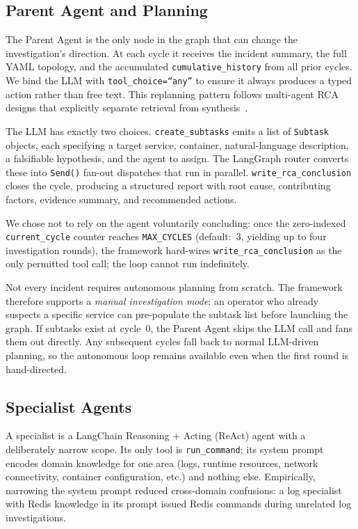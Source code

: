 \documentclass[conference]{IEEEtran}
\begin{document}
\subsection{Parent Agent and Planning}

The Parent Agent is the only node in the graph that can change the
investigation's direction. At each cycle it receives the incident
summary, the full YAML topology, and the accumulated
\texttt{cumulative\_history} from all prior cycles. We bind the LLM
with \texttt{tool\_choice=``any''} to ensure it always produces a
typed action rather than free text. This replanning pattern follows multi-agent RCA
designs that explicitly separate retrieval from synthesis~\cite{fu2026marca, zhou2023dbot}.

The LLM has exactly two choices. \texttt{create\_subtasks} emits a
list of \texttt{Subtask} objects, each specifying a target service,
container, natural-language description, a falsifiable hypothesis, and
the agent to assign. The LangGraph router converts these into
\texttt{Send()} fan-out dispatches that run in parallel.
\texttt{write\_rca\_conclusion} closes the cycle, producing a
structured report with root cause, contributing factors, evidence
summary, and recommended actions.

We chose not to rely on the agent voluntarily concluding: once the zero-indexed \texttt{current\_cycle} counter reaches
\texttt{MAX\_CYCLES} (default:~3, yielding up to four investigation
rounds), the framework hard-wires \texttt{write\_rca\_conclusion}
as the only permitted tool call; the loop cannot run indefinitely.

Not every incident requires autonomous planning from scratch. The
framework therefore supports a \emph{manual investigation mode}: an
operator who already suspects a specific service can pre-populate the
subtask list before launching the graph. If subtasks exist at
cycle~0, the Parent Agent skips the LLM call and fans them out
directly. Any subsequent cycles fall back to normal LLM-driven
planning, so the autonomous loop remains available even when the
first round is hand-directed.

\subsection{Specialist Agents}

A specialist is a LangChain Reasoning + Acting (ReAct) agent with a deliberately narrow
scope. Its only tool is \texttt{run\_command}; its system prompt
encodes domain knowledge for one area (logs, runtime resources,
network connectivity, container configuration, etc.) and nothing else.
Empirically, narrowing the system prompt reduced
cross-domain confusions: a log specialist with Redis knowledge
in its prompt issued Redis commands during unrelated log
investigations.
\end{document}
